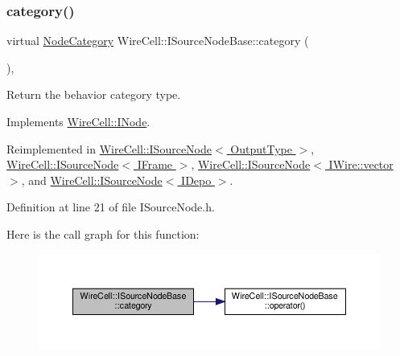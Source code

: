 \subsubsection{\texorpdfstring{category()}{category()}}
{\footnotesize\ttfamily virtual \hyperlink{class_wire_cell_1_1_i_node_a5546e64cbb70bd3ac787295cac9ac803}{Node\+Category} Wire\+Cell\+::\+I\+Source\+Node\+Base\+::category (\begin{DoxyParamCaption}{ }\end{DoxyParamCaption})\hspace{0.3cm}{\ttfamily [inline]}, {\ttfamily [virtual]}}



Return the behavior category type. 



Implements \hyperlink{class_wire_cell_1_1_i_node_a58c07f15b165e5fb33bbc7b2e047b39b}{Wire\+Cell\+::\+I\+Node}.



Reimplemented in \hyperlink{class_wire_cell_1_1_i_source_node_a1742b49fa591d01cd209ed027a7d29ba}{Wire\+Cell\+::\+I\+Source\+Node$<$ Output\+Type $>$}, \hyperlink{class_wire_cell_1_1_i_source_node_a1742b49fa591d01cd209ed027a7d29ba}{Wire\+Cell\+::\+I\+Source\+Node$<$ I\+Frame $>$}, \hyperlink{class_wire_cell_1_1_i_source_node_a1742b49fa591d01cd209ed027a7d29ba}{Wire\+Cell\+::\+I\+Source\+Node$<$ I\+Wire\+::vector $>$}, and \hyperlink{class_wire_cell_1_1_i_source_node_a1742b49fa591d01cd209ed027a7d29ba}{Wire\+Cell\+::\+I\+Source\+Node$<$ I\+Depo $>$}.



Definition at line 21 of file I\+Source\+Node.\+h.

Here is the call graph for this function\+:
\nopagebreak
\begin{figure}[H]
\begin{center}
\leavevmode
\includegraphics[width=350pt]{class_wire_cell_1_1_i_source_node_base_adc531c3da5aa3192940e60390e683736_cgraph}
\end{center}
\end{figure}
\mbox{\label{class_wire_cell_1_1_i_source_node_base_a6d29d551ab4e4b8479a062dfaa38f42f}} 
